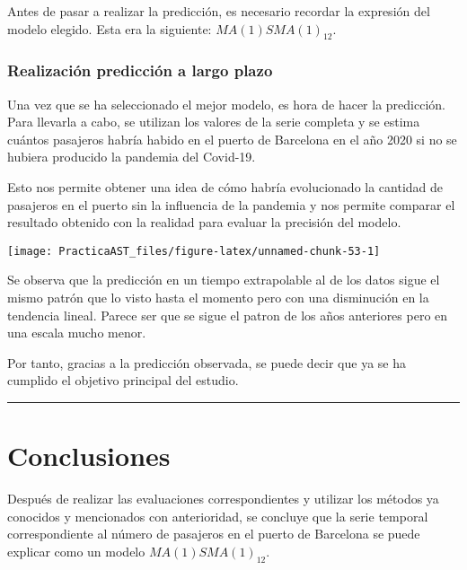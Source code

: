 \documentclass[
]{article}
\begin{document}
Antes de pasar a realizar la predicción, es necesario recordar la
expresión del modelo elegido. Esta era la siguiente:
\(MA(1)SMA(1)_{12}\).

\medskip

\hypertarget{realizaciuxf3n-predicciuxf3n-a-largo-plazo}{%
\subsubsection{Realización predicción a largo
plazo}\label{realizaciuxf3n-predicciuxf3n-a-largo-plazo}}

Una vez que se ha seleccionado el mejor modelo, es hora de hacer la
predicción. Para llevarla a cabo, se utilizan los valores de la serie
completa y se estima cuántos pasajeros habría habido en el puerto de
Barcelona en el año 2020 si no se hubiera producido la pandemia del
Covid-19.

Esto nos permite obtener una idea de cómo habría evolucionado la
cantidad de pasajeros en el puerto sin la influencia de la pandemia y
nos permite comparar el resultado obtenido con la realidad para evaluar
la precisión del modelo.

\begin{center}\texttt{[image: PracticaAST\_files/figure-latex/unnamed-chunk-53-1]} \end{center}

Se observa que la predicción en un tiempo extrapolable al de los datos
sigue el mismo patrón que lo visto hasta el momento pero con una
disminución en la tendencia lineal. Parece ser que se sigue el patron de
los años anteriores pero en una escala mucho menor.

Por tanto, gracias a la predicción observada, se puede decir que ya se
ha cumplido el objetivo principal del estudio.

\begin{center}\rule{0.5\linewidth}{0.5pt}\end{center}

\pagebreak

\hypertarget{conclusiones}{%
\section{Conclusiones}\label{conclusiones}}

Después de realizar las evaluaciones correspondientes y utilizar los
métodos ya conocidos y mencionados con anterioridad, se concluye que la
serie temporal correspondiente al número de pasajeros en el puerto de
Barcelona se puede explicar como un modelo \(MA(1)SMA(1)_{12}\).
\end{document}
